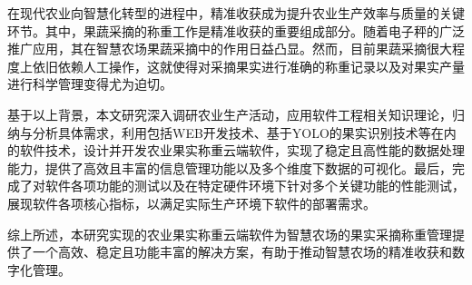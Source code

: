 在现代农业向智慧化转型的进程中，精准收获成为提升农业生产效率与质量的关键环节。其中，果蔬采摘的称重工作是精准收获的重要组成部分。随着电子秤的广泛推广应用，其在智慧农场果蔬采摘中的作用日益凸显。然而，目前果蔬采摘很大程度上依旧依赖人工操作，这就使得对采摘果实进行准确的称重记录以及对果实产量进行科学管理变得尤为迫切。

基于以上背景，本文研究深入调研农业生产活动，应用软件工程相关知识理论，归纳与分析具体需求，利用包括WEB开发技术、基于YOLO的果实识别技术等在内的软件技术，设计并开发农业果实称重云端软件，实现了稳定且高性能的数据处理能力，提供了高效且丰富的信息管理功能以及多个维度下数据的可视化。最后，完成了对软件各项功能的测试以及在特定硬件环境下针对多个关键功能的性能测试，展现软件各项核心指标，以满足实际生产环境下软件的部署需求。

综上所述，本研究实现的农业果实称重云端软件为智慧农场的果实采摘称重管理提供了一个高效、稳定且功能丰富的解决方案，有助于推动智慧农场的精准收获和数字化管理。 